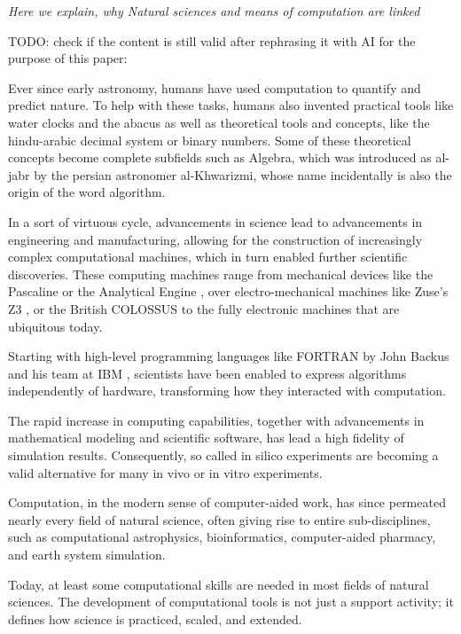 \documentclass[
        twocolumn,german,biblatex
    ]{article}
\begin{document}
    \emph{Here we explain, why Natural sciences and means of computation
    are linked }

    TODO: check if the content is still valid after rephrasing it with
    AI for the purpose of this paper:

    Ever since early astronomy, humans have used computation to quantify
    and predict nature. To help with these tasks, humans also invented
    practical tools like water clocks and the abacus as well as
    theoretical tools and concepts, like the hindu-arabic decimal system
    or binary numbers. Some of these theoretical concepts become
    complete subfields such as Algebra, which was introduced as al-jabr
    by the persian astronomer al-Khwarizmi, whose name incidentally is
    also the origin of the word algorithm.

    In a sort of virtuous cycle, advancements in science lead to
    advancements in engineering and manufacturing, allowing for the
    construction of increasingly complex computational machines, which
    in turn enabled further scientific discoveries. These computing
    machines range from mechanical devices like the Pascaline or the
    Analytical Engine \autocite{bromley2008charles}, over
    electro-mechanical machines like Zuse's Z3 \autocite{Zuse1986}, or
    the British COLOSSUS \autocite{Copeland2004} to the fully electronic
    machines that are ubiquitous today.

    Starting with high-level programming languages like FORTRAN by John
    Backus and his team at IBM \autocite{Backus1978}, scientists have
    been enabled to express algorithms independently of hardware,
    transforming how they interacted with computation.

    The rapid increase in computing capabilities, together with
    advancements in mathematical modeling and scientific software, has
    lead a high fidelity of simulation results. Consequently, so called
    in silico experiments are becoming a valid alternative for many in
    vivo or in vitro experiments.

    Computation, in the modern sense of computer-aided work, has since
    permeated nearly every field of natural science, often giving rise
    to entire sub-disciplines, such as computational astrophysics,
    bioinformatics, computer-aided pharmacy, and earth system
    simulation.

    Today, at least some computational skills are needed in most fields
    of natural sciences. The development of computational tools is not
    just a support activity; it defines how science is practiced,
    scaled, and extended.
\end{document}
